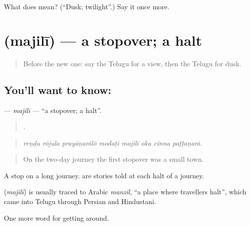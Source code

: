 \begin{tcolorbox}[breakable,colback=teal!4,colframe=teal!35!black,title={Before you move on}]
What does  mean? (\textquotedblleft{}Dusk; twilight\textquotedblright{}.) Say it once more.
\end{tcolorbox}
\section[\texorpdfstring{\te{మజిలీ} (majilī)}{మజిలీ (majilī)}]{ (majilī) — a stopover; a halt}

\label{lesson:TE-C456-majili}



\begin{quote}
Before the new one: say the Telugu for a view, then the Telugu for dusk.
\end{quote}

\subsection*{You'll want to know: }
\textbf{} — \emph{majilī} — \textquotedblleft{}a stopover; a halt\textquotedblright{}.

\begin{quote}
       .
\end{quote}

\begin{quote}
\emph{reṇḍu rōjula prayāṇaṁlō modaṭi majilī oka cinna paṭṭaṇaṁ.}
\end{quote}

\begin{quote}
On the two-day journey the first stopover was a small town.
\end{quote}

A stop on a long journey.   are stories told at each halt of a journey.

\begin{cousinweb}
\textbf{} (\emph{majilī}) is usually traced to Arabic \emph{manzil}, \textquotedblleft{}a place where travellers halt\textquotedblright{}, which came into Telugu through Persian and Hindustani.
\end{cousinweb}

\begin{grammarlens}[title={What you've built}]
One more word for getting around.
\end{grammarlens}

